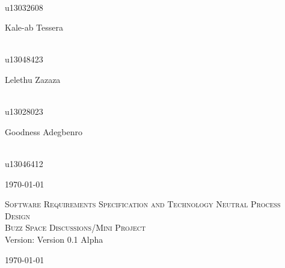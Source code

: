 \documentclass[a4paper,12pt]{report}
\begin{document}
\begin{titlepage}
\begin{center}
\begin{minipage}{0.4\textwidth}
\end{minipage}
\begin{minipage}{0.4\textwidth}
\begin{flushright} \large
\emph{} \\
u13032608
\end{flushright}
\end{minipage}
\begin{minipage}{0.4\textwidth}
\begin{flushleft} \large
Kale-ab {Tessera}
\end{flushleft}
\end{minipage}
\begin{minipage}{0.4\textwidth}
\begin{flushright} \large
\emph{} \\
u13048423
\end{flushright}
\end{minipage}
\begin{minipage}{0.4\textwidth}
\begin{flushleft} \large
Lelethu {Zazaza}
\end{flushleft}
\end{minipage}
\begin{minipage}{0.4\textwidth}
\begin{flushright} \large
\emph{} \\
u13028023
\end{flushright}
\end{minipage}
\begin{minipage}{0.4\textwidth}
\begin{flushleft} \large
Goodness {Adegbenro}
\end{flushleft}
\end{minipage}
\begin{minipage}{0.4\textwidth}
\begin{flushright} \large
\emph{} \\
u13046412
\end{flushright}
\end{minipage}
\vfill
{\large \today}
\end{center}
\end{titlepage}
\footnotesize

\normalsize

\renewcommand{\thesection}{\arabic{section}}
\newpage
\begin{center}
\textsc{\LARGE Software Requirements Specification and Technology Neutral Process Design}\\[1.5cm]
\textsc{\Large Buzz Space Discussions/Mini Project}\\[0.5cm]
Version: Version 0.1 Alpha 

\today
\end{center}
\tableofcontents{}
\end{document}
